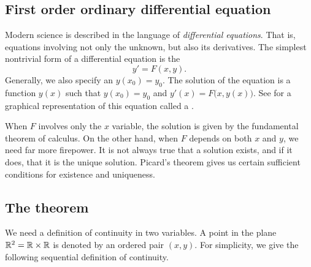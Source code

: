 \subsection{First order ordinary differential equation}

Modern science is described in the language of
\emph{differential equations}.
That is, equations involving not only the unknown, but also its
derivatives.  The simplest nontrivial form of a differential equation is
the \emph{}
\begin{equation*}
y' = F(x,y) .
\end{equation*}
Generally, we also specify an \emph{}
$y(x_0)=y_0$.  The solution of
the equation is a function $y(x)$ such that 
$y(x_0)=y_0$ and $y'(x) = F\bigl(x,y(x)\bigr)$.  See
 for a graphical representation of
this equation called a
\emph{}.
\begin{myfigureht}
\caption{A \emph{slope field} giving the slope $F(x,y)$ at each point,
in this case $F(x,y)=x(1-y)$.  A solution is drawn going through the point
$(x_0,y_0)=(1,0.3)$, notice how it follows the slopes.\label{fig:sampleslopes}}
\end{myfigureht}

When $F$ involves only the $x$ variable, the solution is given by the
fundamental theorem of calculus.  On the other hand, when $F$ depends
on both $x$ and $y$, we need far more firepower.  It is not always
true that a solution exists, and if it does, that it is the unique solution.
Picard's theorem gives us certain sufficient conditions for existence
and uniqueness.

\subsection{The theorem}

We need a definition of continuity in two variables.  A point in the
plane ${\mathbb{R}}^2 = {\mathbb{R}} \times {\mathbb{R}}$ is denoted by an ordered pair $(x,y)$.
For simplicity,
we give the following sequential definition of continuity.

